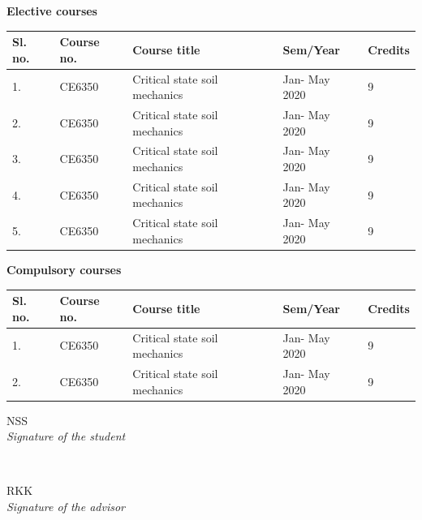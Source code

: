\documentclass[12pt]{article}
\begin{document}
\begin{flushleft} \large
\textbf{Elective courses}
\end{flushleft}
\vspace{-1em}
\begin{table}[!htbp]
\setlength{\tabcolsep}{10pt} 
\renewcommand{\arraystretch}{1.5}
\begin{tabular}{|l|l|l|l|l|}
\hline
\textbf{Sl. no.} & \textbf{Course no.} & \textbf{Course title}         & \textbf{Sem/Year} & \textbf{Credits} \\ \hline
1.               & CE6350              & Critical state soil mechanics & Jan- May 2020     & 9                \\ \hline
2.               & CE6350              & Critical state soil mechanics & Jan- May 2020     & 9                \\ \hline
3.               & CE6350              & Critical state soil mechanics & Jan- May 2020     & 9                \\ \hline
4.               & CE6350              & Critical state soil mechanics & Jan- May 2020     & 9                \\ \hline
5.               & CE6350              & Critical state soil mechanics & Jan- May 2020     & 9                \\ \hline
\end{tabular}
\end{table}
\vspace{-1em}

\begin{flushleft} \large
\textbf{Compulsory courses}
\end{flushleft}
\vspace{-1em}
\begin{table}[!htbp]
\setlength{\tabcolsep}{10pt} 
\renewcommand{\arraystretch}{1.5}
\begin{tabular}{|l|l|l|l|l|}
\hline
\textbf{Sl. no.} & \textbf{Course no.} & \textbf{Course title}         & \textbf{Sem/Year} & \textbf{Credits} \\ \hline
1.               & CE6350              & Critical state soil mechanics & Jan- May 2020     & 9                \\ \hline
2.               & CE6350              & Critical state soil mechanics & Jan- May 2020     & 9                \\ \hline
\end{tabular}
\end{table}

\vspace{10em}
\begin{minipage}{0.5\textwidth}
\begin{flushleft} \large
\textsc{NSS} \\
\emph{Signature of the student} 
\end{flushleft}
\end{minipage}
~
\begin{minipage}{0.4\textwidth}
\begin{flushright} \large
\textsc{RKK} \\
\emph{Signature of the advisor} 
\end{flushright}
\end{minipage}
\end{document}
